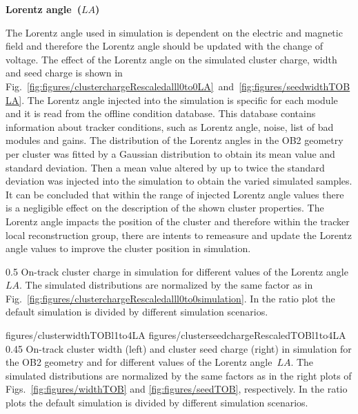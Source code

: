 \textbf{Lorentz angle~($LA$)}

The Lorentz angle used in simulation is dependent on the electric and magnetic field and therefore the Lorentz angle should be updated with the change of voltage. The effect of the Lorentz angle on the simulated cluster charge, width and seed charge is shown in Fig.~\ref{fig:figures/clusterchargeRescaledalll0to0LA}~and~\ref{fig:figures/seedwidthTOBLA}. The Lorentz angle injected into the simulation is specific for each module and it is read from the offline condition database. This database contains information about tracker conditions, such as Lorentz angle, noise, list of bad modules and gains.  The distribution of the Lorentz angles in the OB2 geometry per cluster was fitted by  a Gaussian distribution to obtain its mean value and standard deviation. Then a mean value altered by up to twice the standard deviation was injected into the simulation to obtain the varied simulated samples. It can be concluded that within the range of injected Lorentz angle values there is a negligible effect on the description of the shown cluster properties. The Lorentz angle impacts the position of the cluster and therefore within the tracker local reconstruction group, there are intents to remeasure and update the Lorentz angle values to improve the cluster position in simulation.


                 {0.5}       %
                 { On-track cluster charge in simulation for different values of the Lorentz angle~$LA$.   The simulated distributions are normalized by the same factor as in Fig.~\ref{fig:figures/clusterchargeRescaledalll0to0simulation}.  In the ratio plot the default simulation is divided by different simulation scenarios. }

                 {figures/clusterwidthTOBl1to4LA}
                 {figures/clusterseedchargeRescaledTOBl1to4LA} %
                 {0.45}       %
                 { On-track cluster width (left) and cluster seed charge (right) in simulation for the OB2 geometry and for different values of the Lorentz angle~$LA$.  The simulated distributions are normalized by the same factors as in the right plots of Figs.~\ref{fig:figures/widthTOB} and \ref{fig:figures/seedTOB}, respectively.   In the ratio plots the default simulation is divided by different simulation scenarios. }


